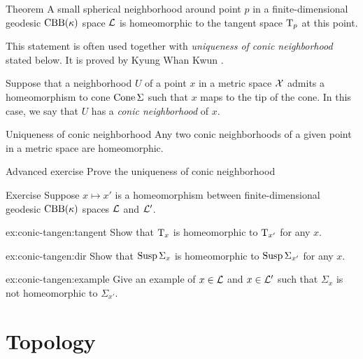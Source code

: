\begin{thm}{Theorem}\label{thm:spherical-nbhd}
A small spherical neighborhood around point $p$ in a finite-dimensional geodesic $\mathrm{CBB}(\kappa)$ space $\mathcal{L}$
is homeomorphic to the tangent space $\mathrm{T}_p$ at this point.
\end{thm}

This statement is often used together with \emph{uniqueness of conic neighborhood} stated below.
It is proved by Kyung Whan Kwun \cite{kwun1964}.

Suppose that a neighborhood $U$ of a point $x$ in a metric space $\mathcal{X}$
admits a homeomorphism to cone $\mathop{\rm Cone}\nolimits\Sigma$ such that $x$ maps to the tip of the cone.
In this case, we say that $U$ has a \emph{conic neighborhood} of $x$.

\begin{thm}{Uniqueness of conic neighborhood}\label{lem:kwun}
Any two conic neighborhoods of a given point in a metric space are homeomorphic.
\end{thm}

\begin{thm}{Advanced exercise}\label{ex:conic}
Prove the uniqueness of conic neighborhood
\end{thm}

\begin{thm}{Exercise}\label{ex:conic-tangent}
Suppose $x\mapsto x'$ is a homeomorphism between finite-dimensional geodesic $\mathrm{CBB}(\kappa)$ spaces $\mathcal{L}$ and $\mathcal{L}'$.

\begin{subthm}{ex:conic-tangen:tangent}
Show that $\mathrm{T}_x$ is homeomorphic to $\mathrm{T}_{x'}$ for any $x$.
\end{subthm}

\begin{subthm}{ex:conic-tangen:dir}
Show that $\mathop{\rm Susp}\nolimits\Sigma_x$ is homeomorphic to $\mathop{\rm Susp}\nolimits\Sigma_{x'}$ for any $x$.
\end{subthm}

\begin{subthm}{ex:conic-tangen:example}
Give an example of $x\in\mathcal{L}$ and $x\in\mathcal{L}'$
such that $\Sigma_x$ is not homeomorphic to $\Sigma_{x'}$.
\end{subthm}


\end{thm}



\section{Topology}

